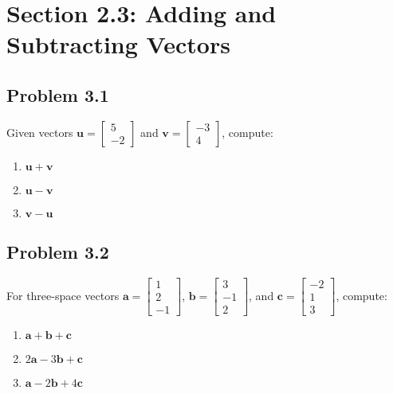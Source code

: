 \documentclass{article}
\begin{document}
\section{Section 2.3: Adding and Subtracting Vectors}

\subsection{Problem 3.1}
Given vectors $\mathbf{u} = \begin{bmatrix} 5 \\ -2 \end{bmatrix}$ and $\mathbf{v} = \begin{bmatrix} -3 \\ 4 \end{bmatrix}$, compute:
\begin{enumerate}
\item $\mathbf{u} + \mathbf{v}$
\item $\mathbf{u} - \mathbf{v}$
\item $\mathbf{v} - \mathbf{u}$
\end{enumerate}

\subsection{Problem 3.2}
For three-space vectors $\mathbf{a} = \begin{bmatrix} 1 \\ 2 \\ -1 \end{bmatrix}$, $\mathbf{b} = \begin{bmatrix} 3 \\ -1 \\ 2 \end{bmatrix}$, and $\mathbf{c} = \begin{bmatrix} -2 \\ 1 \\ 3 \end{bmatrix}$, compute:
\begin{enumerate}
\item $\mathbf{a} + \mathbf{b} + \mathbf{c}$
\item $2\mathbf{a} - 3\mathbf{b} + \mathbf{c}$
\item $\mathbf{a} - 2\mathbf{b} + 4\mathbf{c}$
\end{enumerate}
\end{document}
